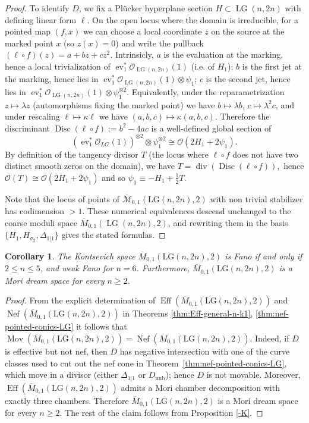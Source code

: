 \documentclass[10pt]{amsart}
\newtheorem{corollary}[theorem]{Corollary}
\theoremstyle{definition}
\newcommand{\Eff}{\operatorname{Eff}}
\newcommand{\Nef}{\operatorname{Nef}}
\newcommand{\Mov}{\operatorname{Mov}}
\newcommand{\LG}{\operatorname{LG}}
\newcommand{\ev}{\operatorname{ev}}
\theoremstyle{plain} %
\begin{document}
\begin{proof}
To identify \(D\), we fix a Plücker hyperplane section $H\subset \LG(n,2n)$ with defining linear form $\ell$. On the open locus where the domain is irreducible, for a pointed map $(f,x)$ we can choose a local coordinate $z$ on the source at the marked point $x$ (so $z(x)=0$) and write the pullback
\(
(\ell\circ f)(z)=a+bz+cz^2 .
\)
Intrinsicly, $a$ is the evaluation at the marking, hence a local trivialization of $\ev_1^*\mathcal O_{\LG(n,2n)}(1)$ (i.e. of $H_1$); $b$ is the first jet at the marking, hence lies in $\ev_1^*\mathcal O_{\LG(n,2n)}(1)\otimes \psi_1$; $c$ is the second jet, hence lies in $\ev_1^*\mathcal O_{\LG(n,2n)}(1)\otimes \psi_1^{\otimes 2}$. Equivalently, under the reparametrization $z\mapsto \lambda z$ (automorphisms fixing the marked point) we have $b\mapsto \lambda b$, $c\mapsto \lambda^2 c$, and under rescaling $\ell\mapsto \kappa \ell$ we have $(a,b,c)\mapsto \kappa(a,b,c)$.
Therefore the discriminant
\(
\operatorname{Disc}(\ell\circ f):=b^2-4ac
\)
is a well-defined global section of
\[
(\ev_1^*\mathcal O_{LG}(1))^{\otimes 2}\otimes \psi_1^{\otimes 2}
\cong \mathcal O(2H_1+2\psi_1).
\]
By definition of the tangency divisor $T$ (the locus where $\ell\circ f$ does not have two distinct smooth zeros on the domain), we have
\(
T = \operatorname{div}(\operatorname{Disc}(\ell\circ f)),
\)
hence $\mathcal O(T)\cong \mathcal O(2H_1+2\psi_1)$ and so \(\psi_1\equiv -H_1+\tfrac12 T\).

Note that the locus of points of $\overline{\mathcal{M}}_{0,1}(\mathrm{LG}(n,2n),2)$ with non trivial stabilizer has codimension $>1$.  These numerical equivalences descend unchanged to the coarse moduli space $\overline{M}_{0,1}(\LG(n,2n),2)$, and rewriting them in the basis $\{H_1,H_{\sigma_2},\Delta_{1|1}\}$ gives the stated formulas.
\end{proof}

\begin{corollary}\label{cor:Fano-weakFano-MDS}
The Kontsevich space $\overline{M}_{0,1}(\mathrm{LG}(n,2n),2)$ is Fano if and only if $2\le n\le 5$, and weak Fano for $n=6$. Furthermore, $\overline{M}_{0,1}(\mathrm{LG}(n,2n),2)$ is a Mori dream space for every $n\ge 2$.
\end{corollary}
\begin{proof}
From the explicit determination of $\Eff(\overline{M}_{0,1}(\mathrm{LG}(n,2n),2))$ and $\Nef(\overline{M}_{0,1}(\mathrm{LG}(n,2n),2))$ in Theorems \ref{thm:Eff-general-n-k1}, \ref{thm:nef-pointed-conics-LG} it follows that $\Mov(\overline{M}_{0,1}(\mathrm{LG}(n,2n),2))=\Nef(\overline{M}_{0,1}(\mathrm{LG}(n,2n),2))$. Indeed, if $D$ is effective but not nef, then $D$ has negative intersection with one of the curve classes used
to cut out the nef cone in Theorem~\ref{thm:nef-pointed-conics-LG}, which move in a divisor (either
$\Delta_{1|1}$ or $D_{\mathrm{unb}}$);
hence $D$ is not movable.
Moreover, $\Eff(\overline{M}_{0,1}(\mathrm{LG}(n,2n),2))$ admits a Mori chamber decomposition with exactly three chambers. Therefore $\overline{M}_{0,1}(\mathrm{LG}(n,2n),2)$ is a Mori dream space for every $n\ge 2$. The rest of the claim follows from Proposition \ref{-K}.
\end{proof}
\end{document}
